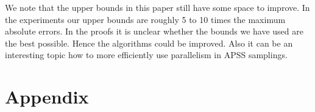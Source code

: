 \documentclass[sigconf,anonymous]{acmart}
\begin{document}
We note that the upper bounds in this paper still have some space to improve. In the experiments our upper bounds are roughly 5 to 10 times the maximum absolute errors. In the proofs it is unclear whether the bounds we have used are the best possible. Hence the algorithms could be improved. Also it can be an interesting topic how to more efficiently use parallelism in APSS samplings.

%



\section{Appendix}

\end{document}
